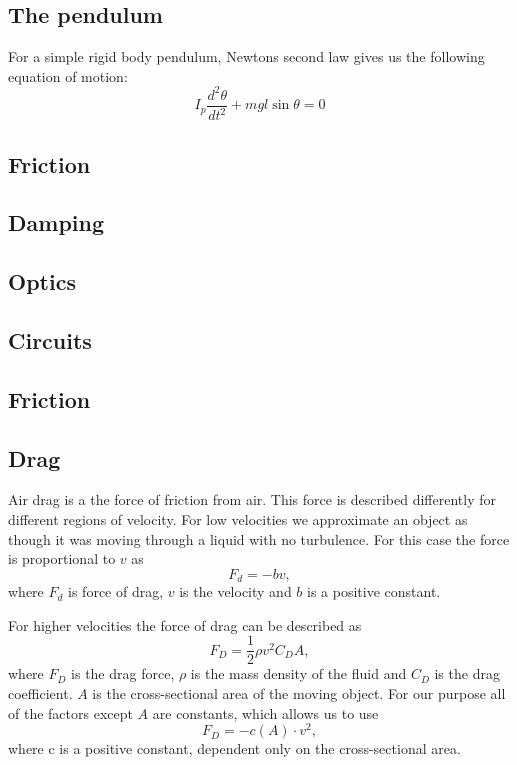 \documentclass[11pt, a4paper]{article}
\begin{document}
\subsection{The pendulum}
For a simple rigid body pendulum, Newtons second law gives us the following
equation of motion:
\begin{equation}
  I_p\frac{d^2\theta}{dt^2} + mgl\sin{\theta} = 0
  \label{eq_of_motion}
\end{equation}



\subsection{Friction}

\subsection{Damping}

\subsection{Optics}
\subsection{Circuits}
\subsection{Friction}
\subsection{Drag}
Air drag is a the force of friction from air. This force is described differently for different regions of velocity. 
For low velocities we approximate an object as though it was moving through a liquid with no turbulence.
For this case the force is proportional to $v$ as
\[
F_d = -bv,
\]
where $F_d$ is force of drag, $v$ is the velocity and $b$ is a positive constant. 

For higher velocities the force of drag can be described as
\[
 F_D = \frac{1}{2}\rho v^2 C_D A,
\]
where $F_D$ is the drag force, $\rho$ is the mass density of the fluid and $C_D$ is the drag coefficient.
$A$ is the cross-sectional area of the moving object.
For our purpose all of the factors except $A$ are constants, which allows us to use
\[
 F_D = -c(A)\cdot v^2,
\]
where c is a positive constant, dependent only on the cross-sectional area.
\end{document}
